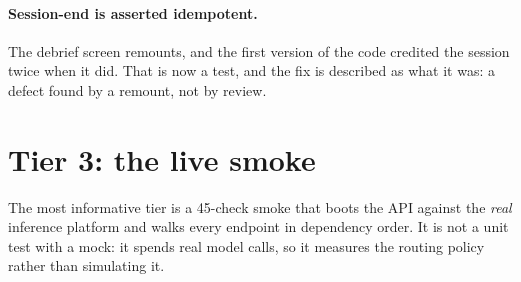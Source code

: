\paragraph{Session-end is asserted idempotent.} The debrief screen remounts, and the first
version of the code credited the session twice when it did. That is now a test, and the fix
is described as what it was: a defect found by a remount, not by review.

\section{Tier 3: the live smoke}
\label{sec:smoke}

The most informative tier is a 45-check smoke that boots the API against the \emph{real}
inference platform and walks every endpoint in dependency order. It is not a unit test with
a mock: it spends real model calls, so it measures the routing policy rather than
simulating it.

